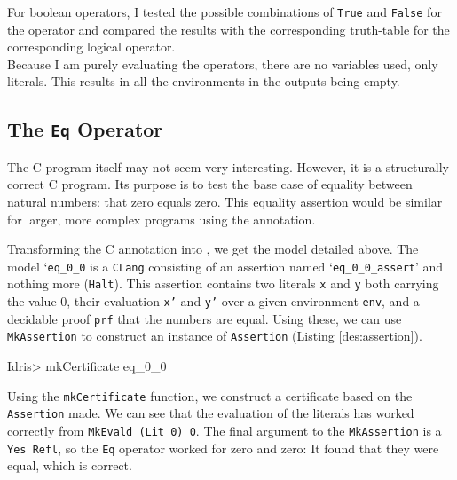    For boolean operators, I tested the possible combinations of \texttt{True} and \texttt{False} for the operator and compared the results with the corresponding truth-table for the corresponding logical operator.
    \\
    
    Because I am purely evaluating the operators, there are no variables used, only literals. This results in all the environments in the \Idris outputs being empty.
	
    \subsection{The \texttt{Eq} Operator}\label{evaln:ops:eq}
        
        
        The C program itself may not seem very interesting. However, it is a structurally correct C program. Its purpose is to test the base case of equality between natural numbers: that zero equals zero. This equality assertion would be similar for larger, more complex programs using the annotation.
        
        \newpage
        
        
        Transforming the C annotation into \Idris, we get the model detailed above. The model `\texttt{eq\_0\_0} is a \texttt{CLang} consisting of an assertion named `\texttt{eq\_0\_0\_assert}' and nothing more (\texttt{Halt}). This assertion contains two literals \texttt{x} and \texttt{y} both carrying the value 0, their evaluation \texttt{x'} and \texttt{y'} over a given environment \texttt{env}, and a decidable proof \texttt{prf} that the numbers are equal. Using these, we can use \texttt{MkAssertion} to construct an instance of \texttt{Assertion} (Listing \ref{des:assertion}).
        
        \begin{code}
Idris> mkCertificate eq_0_0
        \end{code}
        
        Using the \texttt{mkCertificate} function, we construct a certificate based on the \texttt{Assertion} made. We can see that the evaluation of the literals has worked correctly from \texttt{MkEvald (Lit 0) 0}. The final argument to the \texttt{MkAssertion} is a \texttt{Yes Refl}, so the \texttt{Eq} operator worked for zero and zero: It found that they were equal, which is correct.
        
